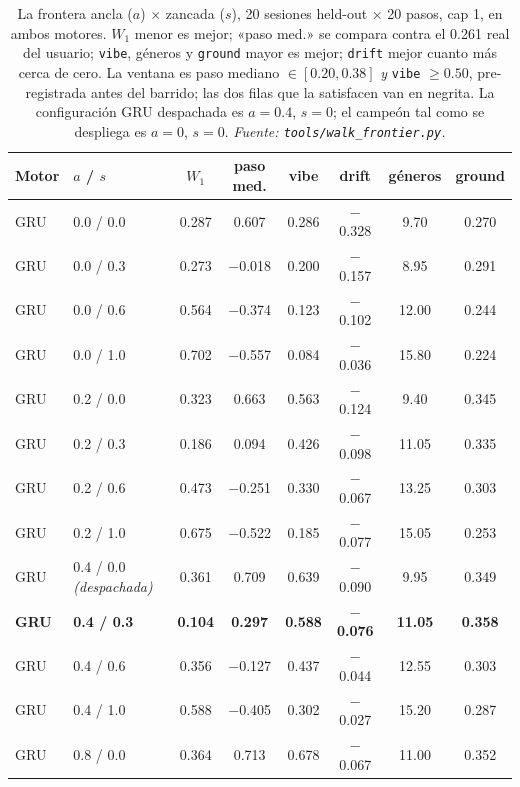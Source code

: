 \documentclass[11pt]{article}
\newcommand{\best}[1]{\textbf{#1}}
\begin{document}
\begin{table}[ht]
  \centering
  \caption{La frontera ancla ($a$) $\times$ zancada ($s$), \num{20} sesiones
  held-out $\times$ \num{20} pasos, cap 1, en ambos motores. $W_1$ menor es
  mejor; «paso med.» se compara contra el \num{0.261} real del usuario;
  \texttt{vibe}, géneros y \texttt{ground} mayor es mejor; \texttt{drift} mejor
  cuanto más cerca de cero. La ventana es paso mediano
  $\in[\num{0.20},\num{0.38}]$ \emph{y} \texttt{vibe} $\ge\num{0.50}$,
  pre-registrada antes del barrido; las dos filas que la satisfacen van en
  negrita. La configuración GRU despachada es $a=\num{0.4}$, $s=\num{0}$; el
  campeón tal como se despliega es $a=\num{0}$, $s=\num{0}$.
  \emph{Fuente: \texttt{tools/walk\_frontier.py}.}}
  \label{tab:walk-frontier}
  {\footnotesize\setlength{\tabcolsep}{5pt}\begin{tabular}{llcccccc}
    \toprule
    Motor & $a$ / $s$ & $W_1$ & paso med. & vibe & drift & géneros & ground \\
    \midrule
    GRU & 0.0 / 0.0 & 0.287 & 0.607 & 0.286 & $-$0.328 & 9.70 & 0.270 \\
    GRU & 0.0 / 0.3 & 0.273 & $-$0.018 & 0.200 & $-$0.157 & 8.95 & 0.291 \\
    GRU & 0.0 / 0.6 & 0.564 & $-$0.374 & 0.123 & $-$0.102 & 12.00 & 0.244 \\
    GRU & 0.0 / 1.0 & 0.702 & $-$0.557 & 0.084 & $-$0.036 & 15.80 & 0.224 \\
    GRU & 0.2 / 0.0 & 0.323 & 0.663 & 0.563 & $-$0.124 & 9.40 & 0.345 \\
    GRU & 0.2 / 0.3 & 0.186 & 0.094 & 0.426 & $-$0.098 & 11.05 & 0.335 \\
    GRU & 0.2 / 0.6 & 0.473 & $-$0.251 & 0.330 & $-$0.067 & 13.25 & 0.303 \\
    GRU & 0.2 / 1.0 & 0.675 & $-$0.522 & 0.185 & $-$0.077 & 15.05 & 0.253 \\
    GRU & 0.4 / 0.0 \emph{(despachada)} & 0.361 & 0.709 & 0.639 & $-$0.090 & 9.95 & 0.349 \\
    \best{GRU} & \best{0.4 / 0.3} & \best{0.104} & \best{0.297} & \best{0.588} & \best{$-$0.076} & \best{11.05} & \best{0.358} \\
    GRU & 0.4 / 0.6 & 0.356 & $-$0.127 & 0.437 & $-$0.044 & 12.55 & 0.303 \\
    GRU & 0.4 / 1.0 & 0.588 & $-$0.405 & 0.302 & $-$0.027 & 15.20 & 0.287 \\
    GRU & 0.8 / 0.0 & 0.364 & 0.713 & 0.678 & $-$0.067 & 11.00 & 0.352 \\

\end{tabular}}
\end{table}
\end{document}
